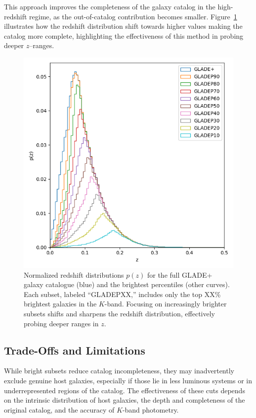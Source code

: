 This approach improves the completeness of the galaxy catalog in the high-redshift regime, as the out-of-catalog contribution becomes smaller. Figure~\ref{fig:z_dist} illustrates how the redshift distribution shift towards higher values making the catalog more complete, highlighting the effectiveness of this method in probing deeper $z$--ranges.

\begin{figure}[h!]
  \centering
  \includegraphics[width=0.7\linewidth]{figures/z_dist_perc.png}
  \caption[Normalized redshift distributions $p(z)$ for the GLADE+ galaxy catalogue and the brightest percentiles.]{Normalized redshift distributions $p(z)$ for the full GLADE+ galaxy catalogue (blue) and the brightest percentiles (other curves). Each subset, labeled “GLADEPXX,” includes only the top XX\% brightest galaxies in the $K$-band. Focusing on increasingly brighter subsets shifts and sharpens the redshift distribution, effectively probing deeper ranges in $z$.}
  \label{fig:z_dist}
\end{figure}

\subsection{Trade-Offs and Limitations}

While bright subsets reduce catalog incompleteness, they may inadvertently exclude genuine host galaxies, especially if those lie in less luminous systems or in underrepresented regions of the catalog. The effectiveness of these cuts depends on the intrinsic distribution of host galaxies, the depth and completeness of the original catalog, and the accuracy of $K$-band photometry. 

